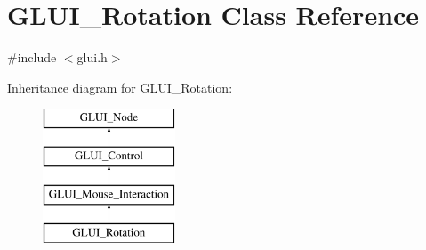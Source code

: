 \hypertarget{classGLUI__Rotation}{\section{G\-L\-U\-I\-\_\-\-Rotation Class Reference}
\label{classGLUI__Rotation}
}


{\ttfamily \#include $<$glui.\-h$>$}

Inheritance diagram for G\-L\-U\-I\-\_\-\-Rotation\-:\begin{figure}[H]
\begin{center}
\leavevmode
\includegraphics[height=4.000000cm]{classGLUI__Rotation}
\end{center}
\end{figure}
